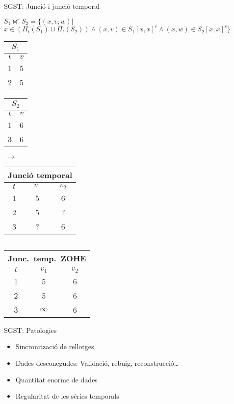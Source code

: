 \begin{frame}{SGST: Junció i junció temporal }
\begin{center}
  \begin{definition}
  $S_1 \Join^r S_2 = \{ (x,v,w) |$\\
{\hfill
  $x \in
  (\Pi_{t}(S_1) \cup
  \Pi_{t}(S_2))\wedge (x,v) \in S_1[x,x]^r
  \wedge (x,w) \in S_2[x,x]^r \}$}
\end{definition}
{\small
\begin{tabular}[h]{|c|c|}
    \multicolumn{2}{c}{$S_1$} \\ \hline
      $t$ & $v$ \\\hline
      1 & 5 \\
      2 & 5 \\\hline
    \end{tabular}
    \begin{tabular}[h]{|c|c|}
    \multicolumn{2}{c}{$S_2$} \\ \hline
      $t$ & $v$ \\\hline
      1 & 6 \\
      3 & 6 \\\hline
    \end{tabular}$\;\longrightarrow\;$
    \begin{tabular}[h]{|c|c|c|}
    \multicolumn{3}{c}{Junció temporal} \\ \hline
      $t$ & $v_1$ & $v_2$ \\\hline
      1 & 5 & 6  \\
      2 & 5 & ?  \\
      3 & ? & 6\\\hline
    \end{tabular}$\quad$
    \begin{tabular}[h]{|c|c|c|}
    \multicolumn{3}{c}{Junc.~temp.~ZOHE} \\ \hline
      $t$ & $v_1$ & $v_2$ \\\hline
      1 & 5 & 6  \\
      2 & 5 & 6  \\
      3 & $\infty$ & 6\\\hline
    \end{tabular}
}
 


 \end{center}


\end{frame}


\begin{frame}{SGST: Patologies}


  \begin{itemize}

    \item Sincronització de rellotges \parencite{kopetz11:realtime}
    \item Dades desconegudes: Validació, rebuig, reconstrucció\dots
    \item Quantitat enorme de dades
    \item Regularitat de les sèries temporals
  \end{itemize}
  

\end{frame}




